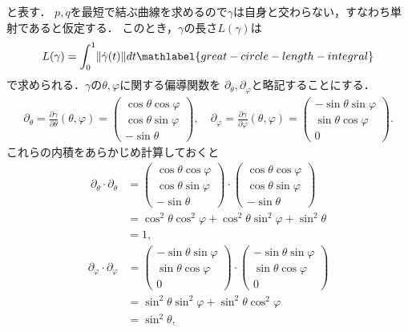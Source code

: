 \documentclass{ltjsbook}
\begin{document}
と表す．
\(p, q\)を最短で結ぶ曲線を求めるので\(\gamma\)は自身と交わらない，すなわち単射であると仮定する．
このとき，\(\gamma\)の長さ\(L(\gamma)\)は
\begin{align}
    L(\gamma) = \int_{0}^{1} \lVert \dot{\gamma}(t) \rVert  dt
    \mathlabel{great-circle-length-integral}
\end{align}
で求められる．\(\gamma\)の\(\theta, \varphi\)に関する偏導関数を
\(\partial_\theta, \partial_\varphi\)と略記することにする．
\begin{align*}
    \partial_\theta
    = \frac{\partial \gamma}{\partial \theta}(\theta, \varphi)
    =
    \begin{pmatrix}
        \cos \theta \cos \varphi \\
        \cos \theta \sin \varphi \\
        - \sin \theta
    \end{pmatrix},
    \quad
    \partial_\varphi
    = \frac{\partial \gamma}{\partial \varphi}(\theta, \varphi)
    =
    \begin{pmatrix}
        - \sin \theta \sin \varphi \\
        \sin \theta \cos \varphi \\
        0
    \end{pmatrix}.
\end{align*}
これらの内積をあらかじめ計算しておくと
\begin{align*}
    \partial_\theta \cdot \partial_\theta
    &=
    \begin{pmatrix}
        \cos \theta \cos \varphi \\
        \cos \theta \sin \varphi \\
        - \sin \theta
    \end{pmatrix}
    \cdot
    \begin{pmatrix}
        \cos \theta \cos \varphi \\
        \cos \theta \sin \varphi \\
        - \sin \theta
    \end{pmatrix} \\
    &= \cos^2 \theta \cos^2 \varphi
        + \cos^2 \theta \sin^2 \varphi
        + \sin^2 \theta \\
    &= 1,
\end{align*}
\begin{align*}
    \partial_\varphi \cdot \partial_\varphi
    &=
    \begin{pmatrix}
        - \sin \theta \sin \varphi \\
        \sin \theta \cos \varphi \\
        0
    \end{pmatrix}
    \cdot
    \begin{pmatrix}
        - \sin \theta \sin \varphi \\
        \sin \theta \cos \varphi \\
        0
    \end{pmatrix} \\
    &= \sin^2 \theta \sin^2 \varphi + \sin^2 \theta \cos^2 \varphi \\
    &= \sin^2 \theta,
\end{align*}
\end{document}
